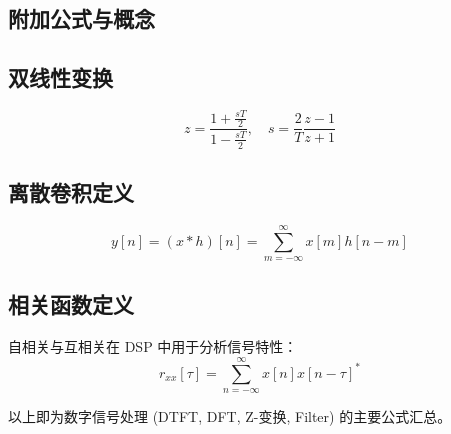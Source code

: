 \documentclass[12pt,a4paper]{article}
\begin{document}
\begin{CJK}{UTF8}{gbsn}
\section{附加公式与概念}

\subsection{双线性变换}
\[
z = \frac{1 + \frac{sT}{2}}{1 - \frac{sT}{2}}, \quad s = \frac{2}{T}\frac{z-1}{z+1}
\]

\subsection{离散卷积定义}
\[
y[n] = (x*h)[n] = \sum_{m=-\infty}^{\infty} x[m] h[n-m]
\]

\subsection{相关函数定义}
自相关与互相关在 DSP 中用于分析信号特性：
\[
r_{xx}[\tau] = \sum_{n=-\infty}^{\infty} x[n]x[n-\tau]^*
\]

以上即为数字信号处理 (DTFT, DFT, Z-变换, Filter) 的主要公式汇总。

\end{CJK}
\end{document}
